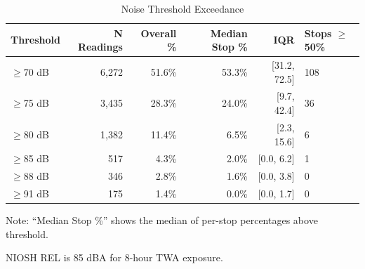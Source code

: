 \begin{table}[htbp]
\centering
\caption{Noise Threshold Exceedance}
\label{tab:thresholds}
\begin{tabular}{lrrrrl}
\toprule
Threshold & N Readings & Overall \% & Median Stop \% & IQR & Stops $\geq$50\% \\
\midrule
$\geq$70 dB & 6,272 & 51.6\% & 53.3\% & [31.2, 72.5] & 108 \\
$\geq$75 dB & 3,435 & 28.3\% & 24.0\% & [9.7, 42.4] & 36 \\
$\geq$80 dB & 1,382 & 11.4\% & 6.5\% & [2.3, 15.6] & 6 \\
$\geq$85 dB & 517 & 4.3\% & 2.0\% & [0.0, 6.2] & 1 \\
$\geq$88 dB & 346 & 2.8\% & 1.6\% & [0.0, 3.8] & 0 \\
$\geq$91 dB & 175 & 1.4\% & 0.0\% & [0.0, 1.7] & 0 \\
\bottomrule
\end{tabular}
\begin{tablenotes}
\small
\item Note: ``Median Stop \%'' shows the median of per-stop percentages above threshold.
\item NIOSH REL is 85 dBA for 8-hour TWA exposure.
\end{tablenotes}
\end{table}
